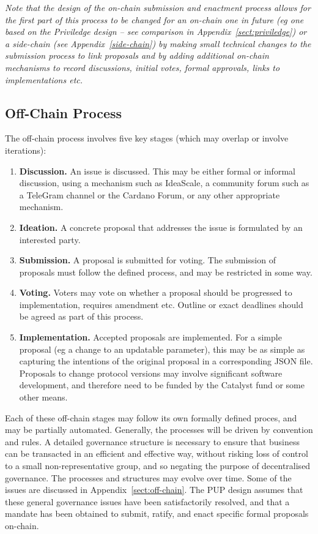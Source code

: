 \emph{Note that the design of the on-chain submission and enactment process allows for the first part of this process to be changed for an on-chain one in future
  (eg one based on the Priviledge design -- see comparison in Appendix~\ref{sect:priviledge}) or a side-chain (see Appendix~\ref{side-chain}) by making small technical
  changes to the submission process to link proposals and by adding additional on-chain mechanisms to record discussions, initial votes, formal approvals, links to implementations etc.}


\newpage
\subsection{Off-Chain Process}

The off-chain process involves five key stages (which may overlap or involve iterations):

\begin{enumerate}
\item
  \textbf{Discussion.}  An issue is discussed.  This may be either formal or informal discussion, using a mechanism such as IdeaScale, a community forum such as a TeleGram channel or the Cardano Forum,
  or any other appropriate mechanism.
\item
  \textbf{Ideation.}  A concrete proposal that addresses the issue is formulated by an interested party.
\item
  \textbf{Submission.}  A proposal is submitted for voting.  The submission of proposals must follow the defined process, and may be restricted in some way.
\item
  \textbf{Voting.}  Voters may vote on whether a proposal should be progressed to implementation, requires amendment etc.  Outline or exact deadlines should be agreed as part of this process.
\item
  \textbf{Implementation.}  Accepted proposals are implemented.  For a simple proposal (eg a change to an updatable parameter), this may be as simple as capturing the intentions of the original proposal in a corresponding JSON file.
  Proposals to change protocol versions may involve significant software development, and therefore need to be funded by the Catalyst fund or some other means.
\end{enumerate}

Each of these off-chain stages may follow its own formally defined proces, and may be partially automated.  Generally, the processes will be driven by convention and rules.  A detailed governance structure is necessary to ensure that business can
be transacted in an efficient and effective way, without risking loss of control to a small non-representative group, and so negating the purpose of decentralised governance.
The processes and structures may evolve over time.  Some of the issues are discussed in Appendix~\ref{sect:off-chain}.  The PUP design assumes that these general governance
issues have been satisfactorily resolved, and that a mandate has been obtained to submit, ratify, and enact specific formal proposals on-chain.


